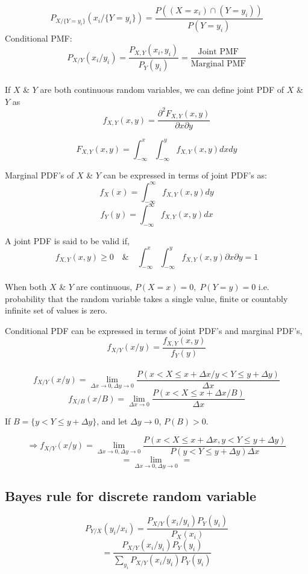 \documentclass{article}
\begin{document}
$$ P_{X/\{ Y = y_i \}}(x_i/\{ Y = y_i \})= \frac{P((X= x_i) \cap (Y=y_i))}{P(Y=y_i)}$$
Conditional PMF:
$$ P_{X/Y} (x_i /y_i)= \frac{P_{X,Y}(x_i,y_i)}{P_Y(y_i)}= \frac{\text{Joint PMF}}{\text{Marginal PMF}}$$
\\



If $X$ \& $Y$ are both continuous random variables, we can define joint PDF of $X$ \& $Y$ as
$$ f_{X,Y}(x,y)= \frac{\partial^2 F_{X,Y}(x,y)}{\partial x \partial y}$$

$$ F_{X,Y}(x,y) =\int_{-\infty}^{x} \int_{-\infty}^{y} f_{X,Y}(x,y) dx dy$$

Marginal PDF's of $X$ \& $Y$ can be expressed in terms of joint PDF's as:
$$ f_X (x)= \int_{-\infty}^{\infty} f_{X,Y}(x,y) dy$$
$$ f_Y (y)= \int_{-\infty}^{\infty} f_{X,Y}(x,y) dx$$

A joint PDF is said to be valid if,
$$ f_{X,Y}(x,y) \geq 0 \quad \& \quad \int_{-\infty}^{x} \int_{-\infty}^{y} f_{X,Y}(x,y)\partial x \partial y =1$$
\\

When both $X$ \& $Y$ are continuous,
$P(X=x )=0,\; P(Y=y)=0 $ i.e. probability that the random variable takes a single value, finite or countably infinite set of values is zero.

Conditional PDF can be expressed in terms of joint PDF's and marginal PDF's,
$$ f_{X/Y}(x/y)=\frac{f_{X,Y}(x,y)}{f_Y (y)}$$ \\

$$ f_{X/Y}(x/y)= \lim_{\Delta x \to 0, \Delta y \to 0} \frac{P(x<X \leq x+ \Delta x / y<Y \leq y+ \Delta y)}{\Delta x}$$
$$ f_{X/B}(x/B)= \lim_{\Delta x \to 0} \frac{P(x<X \leq x+ \Delta x /B)}{\Delta x}$$

If $B= \{ y<Y \leq y+ \Delta y \}$, and let $\Delta y \to 0$, $P(B) > 0$.

$$ \Rightarrow f_{X/Y}(x/y)= \lim_{\Delta x \to 0, \Delta y \to 0} \frac{P(x<X \leq x+ \Delta x , y<Y \leq y+ \Delta y)}{P(y<Y \leq y+ \Delta y)\Delta x} $$
$$= \lim_{\Delta x \to 0, \Delta y \to 0} \frac{}{} = $$

\subsection{Bayes rule for discrete random variable}
$$ P_{Y/X}(y_i /x_i) = \frac{P_{X/Y} (x_i/y_i) P_Y (y_i)}{P_X (x_i)}$$
$$ =\frac{P_{X/Y} (x_i/y_i) P_Y (y_i)}{\sum_{y_i}P_{X/Y}(x_i/y_i) P_Y (y_i)}$$
\end{document}
